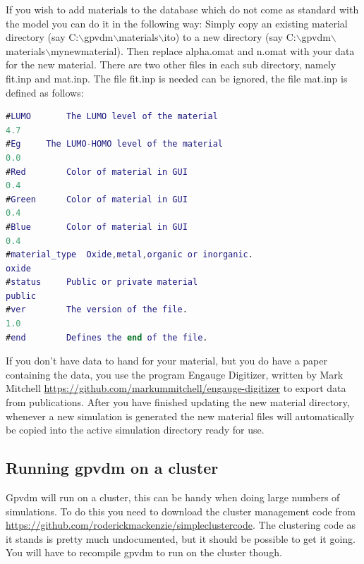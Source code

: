 \documentclass[11pt]{article}
\begin{document}
If you wish to add materials to the database which do not come as standard with the model you can do it in the following way:  Simply copy an existing material directory (say C:$\backslash$gpvdm$\backslash$materials$\backslash$ito) to a new directory (say C:$\backslash$gpvdm$\backslash$materials$\backslash$mynewmaterial).  Then replace alpha.omat and n.omat with your data for the new material. There are two other files in each sub directory, namely fit.inp and mat.inp.  The file fit.inp is needed can be ignored, the file mat.inp is defined as follows:
\newline
\newline
\begin{lstlisting}[language=matlab,frame=single]
#LUMO		The LUMO level of the material 
4.7
#Eg		The LUMO-HOMO level of the material
0.0
#Red		Color of material in GUI
0.4
#Green		Color of material in GUI
0.4
#Blue		Color of material in GUI
0.4
#material_type	Oxide,metal,organic or inorganic.
oxide
#status		Public or private material
public
#ver		The version of the file.
1.0
#end		Defines the end of the file.
\end{lstlisting}

If you don't have data to hand for your material, but you do have a paper containing the data, you use the program Engauge Digitizer, written by  Mark Mitchell \url{https://github.com/markummitchell/engauge-digitizer} to export data from publications.  After you have finished updating the new material directory, whenever a new simulation is generated the new material files will automatically be copied into the active simulation directory ready for use. 

\subsection{Running gpvdm on a cluster}
Gpvdm will run on a cluster, this can be handy when doing large numbers of simulations.  To do this you need to download the cluster management code from  \url{https://github.com/roderickmackenzie/simpleclustercode}.  The clustering code as it stands is pretty much undocumented, but it should be possible to get it going.  You will have to recompile gpvdm to run on the cluster though.
\end{document}
